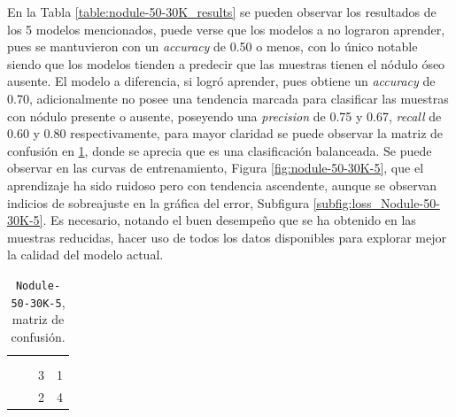 En la Tabla \ref{table:nodule-50-30K_results} se pueden observar los resultados de los 5 modelos mencionados, puede verse que los modelos  a  no lograron aprender, pues se mantuvieron con un \textit{accuracy} de 0.50 o menos, con lo único notable siendo que los modelos tienden a predecir que las muestras tienen el nódulo óseo ausente. El modelo  a diferencia, si logró aprender, pues obtiene un \textit{accuracy} de 0.70, adicionalmente no posee una tendencia marcada para clasificar las muestras con nódulo presente o ausente, poseyendo una \textit{precision} de 0.75 y 0.67, \textit{recall} de 0.60 y 0.80 respectivamente, para mayor claridad se puede observar la matriz de confusión en \ref{table:50-30K-confusion}, donde se aprecia que es una clasificación balanceada. Se puede observar en las curvas de entrenamiento, Figura \ref{fig:nodule-50-30K-5}, que el aprendizaje ha sido ruidoso pero con tendencia ascendente, aunque se observan indicios de sobreajuste en la gráfica del error, Subfigura \ref{subfig:loss_Nodule-50-30K-5}. Es necesario, notando el buen desempeño que se ha obtenido en las muestras reducidas, hacer uso de todos los datos disponibles para explorar mejor la calidad del modelo actual.

\begin{table}[h]
\centering
\begin{tabular}{cc|cc|}
\cline{3-4}
 &  & \multicolumn{2}{c|}{\cellcolor[HTML]{FFCB2F}{Real}} \\ \cline{3-4}
 &  & \multicolumn{1}{c|}{\cellcolor[HTML]{FFCB2F}{Presente}} & \cellcolor[HTML]{FFCB2F}{Ausente} \\ \hline
\multicolumn{1}{|c|}{\cellcolor[HTML]{FFC702}} & \cellcolor[HTML]{FFC702}{Presente} & \multicolumn{1}{c|}{3} & 1 \\ \cline{2-4}
\multicolumn{1}{|c|}{\multirow{-2}{*}{\cellcolor[HTML]{FFC702}{Predicción}}} & \cellcolor[HTML]{FFC702}{Ausente} & \multicolumn{1}{c|}{2} & 4 \\ \hline
\end{tabular}
\caption[Nodule-50-30K-5: Matriz de confusión]{\lstinline!Nodule-50-30K-5!, matriz de confusión.}
\label{table:50-30K-confusion}
\end{table}

